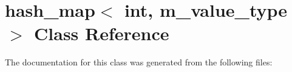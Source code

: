 \hypertarget{classhash__map_3_01int_00_01m__value__type_01_4}{
\section{hash\_\-map$<$ int, m\_\-value\_\-type $>$ Class Reference}
\label{classhash__map_3_01int_00_01m__value__type_01_4}
}


The documentation for this class was generated from the following files: